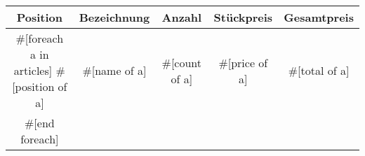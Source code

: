 \documentclass{article}
\begin{document}
\begin{center}
    \begin{tabu}{ c | c | c | c | c }
        \rowfont{\color{white}}
        Position & Bezeichnung & Anzahl & Stückpreis & Gesamtpreis \\ [0.25ex] %
        \hline
        #[foreach a in articles]
        #[position of a] & #[name of a] & #[count of a] & #[price of a] & #[total of a] \\ \hline
        #[end foreach]
    \end{tabu}
\end{center}
\end{document}

